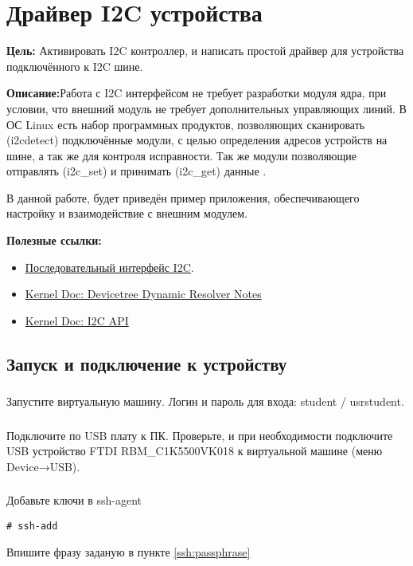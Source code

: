 \chapter{Драйвер I2C устройства}
\textbf{Цель:} Активировать I2C контроллер, и написать простой драйвер для устройства подключённого к I2C шине.

\vspace{5mm}
\textbf{Описание:}Работа с I2C интерфейсом не требует разработки модуля ядра, при условии, что внешний модуль не требует дополнительных управляющих линий. В ОС Linux есть набор программных продуктов, позволяющих сканировать (i2cdetect) подключённые модули, с целью определения адресов устройств на шине, а так же для контроля исправности. Так же модули позволяющие отправлять (i2c\_set) и принимать (i2c\_get) данные .

В данной работе, будет приведён пример приложения, обеспечивающего настройку и взаимодействие с внешним модулем. 

\vspace{5mm}
\textbf{Полезные ссылки:}
\begin{itemize}
	\item \href{http://www.gaw.ru/html.cgi/txt/interface/iic/start.htm}{Последовательный интерфейс I2C}.
	\item \href{https://docs.kernel.org/devicetree/dynamic-resolution-notes.html}{Kernel Doc: Devicetree Dynamic Resolver Notes}
	\item \href{https://www.kernel.org/doc/html/v4.15/driver-api/i2c.html}{Kernel Doc: I2C API}	
\end{itemize}

\section{Запуск и подключение к устройству}

\subsection{}Запустите виртуальную машину. Логин и пароль для входа: student / usrstudent.

\subsection{}Подключите по USB плату к ПК. Проверьте, и при необходимости подключите USB устройство FTDI RBM\_C1K5500VK018 к виртуальной машине (меню Device→USB).

\subsection{}Добавьте ключи в ssh-agent
\begin{lstlisting}[style=bash]
	# ssh-add
\end{lstlisting}
Впишите фразу заданую в пункте \ref{ssh:passphrase}

